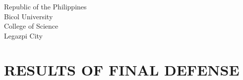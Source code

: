 \newcommand{\specialcell}[2][c]{\begin{tabular}[#1]{@{}l@{}}#2\end{tabular}}

\begin{center}
	{	Republic of the Philippines \\
		Bicol University \\
		College of Science \\
		Legazpi City \\[0.1ex]}
\end{center} 

\section{\normalsize{RESULTS OF FINAL DEFENSE}}

